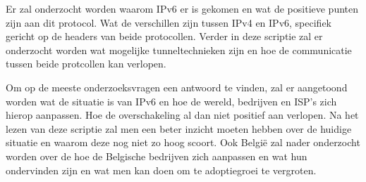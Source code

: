 Er zal onderzocht worden waarom IPv6 er is gekomen en wat de positieve punten zijn aan dit protocol. Wat de verschillen zijn tussen IPv4 en IPv6, specifiek gericht op de headers van beide protocollen. Verder in deze scriptie zal er onderzocht worden wat mogelijke tunneltechnieken zijn en hoe de communicatie tussen beide protcollen kan verlopen.

Om op de meeste onderzoeksvragen een antwoord te vinden, zal er aangetoond worden wat de situatie is van IPv6 en hoe de wereld, bedrijven en ISP's zich hierop aanpassen. Hoe de overschakeling al dan niet positief aan verlopen. Na het lezen van deze scriptie zal men een beter inzicht moeten hebben over de huidige situatie en waarom deze nog niet zo hoog scoort. Ook België zal nader onderzocht worden over de hoe de Belgische bedrijven zich aanpassen en wat hun ondervinden zijn en wat men kan doen om te adoptiegroei te vergroten.





